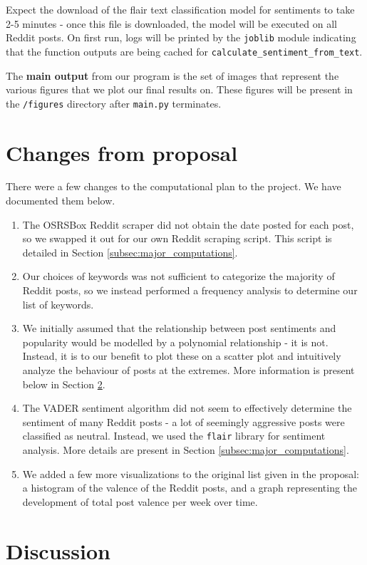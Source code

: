 \documentclass[fontsize=11pt]{article}
\begin{document}
Expect the download of the flair text classification model for sentiments to take 2-5 minutes - once this file is downloaded, the model will be executed on all Reddit posts. On first run, logs will be printed by the \texttt{joblib} module indicating that the function outputs are being cached for \texttt{calculate\_sentiment\_from\_text}. 

The \textbf{main output} from our program is the set of images that represent the various figures that we plot our final results on. These figures will be present in the \texttt{/figures} directory after \texttt{main.py} terminates.

\section{Changes from proposal}
There were a few changes to the computational plan to the project. We have documented them below.
\begin{enumerate}
    \item The OSRSBox Reddit scraper did not obtain the date posted for each post, so we swapped it out for our own Reddit scraping script. This script is detailed in Section \ref{subsec:major_computations}.
    \item Our choices of keywords was not sufficient to categorize the majority of Reddit posts, so we instead performed a frequency analysis to determine our list of keywords.
    \item We initially assumed that the relationship between post sentiments and popularity would be modelled by a polynomial relationship - it is not. Instead, it is to our benefit to plot these on a scatter plot and intuitively analyze the behaviour of posts at the extremes. More information is present below in Section \ref{sec:discussion}.
    \item The VADER sentiment algorithm did not seem to effectively determine the sentiment of many Reddit posts - a lot of seemingly aggressive posts were classified as neutral. Instead, we used the \texttt{flair} library for sentiment analysis. More details are present in Section \ref{subsec:major_computations}.
    \item We added a few more visualizations to the original list given in the proposal: a histogram of the valence of the Reddit posts, and a graph representing the development of total post valence per week over time.
\end{enumerate}

\section{Discussion}
\label{sec:discussion}
\end{document}
